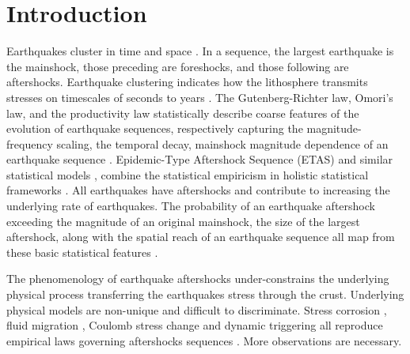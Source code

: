 \documentclass[12pt, notitlepage]{report}
\begin{document}
\section{Introduction}
Earthquakes cluster in time and space \cite{Omori1895}. In a sequence, the largest earthquake is the mainshock, those preceding are foreshocks, and those following are aftershocks. Earthquake clustering indicates how the lithosphere transmits stresses on timescales of seconds to years \cite{felzer2006decay, Stein1999, Scholz2019TheFaulting, Shebalin2017}. The Gutenberg-Richter law, Omori's law, and the productivity law statistically describe coarse features of the evolution of earthquake sequences, respectively capturing the magnitude-frequency scaling, the temporal decay, mainshock magnitude dependence of an earthquake sequence  \cite{deArcangelis2016StatisticalForecasting, Helmstetter2003BathsProperties, GutenbergBulletinAmerica,Omori1895}. Epidemic-Type Aftershock Sequence (ETAS) \cite{Kagan1981StochasticCatalogs,Ogata1988} and similar statistical models \cite{Holliday2008ABASS}, combine the statistical empiricism in holistic statistical frameworks \cite{ogata2017statistics}. All earthquakes have aftershocks and contribute to increasing the underlying rate of earthquakes. The probability of an earthquake aftershock exceeding the magnitude of an original mainshock, the size of the largest aftershock, along with the spatial reach of an earthquake sequence all map from these basic statistical features \cite{Helmstetter2003BathsProperties, Reasenberg1999ForeshockEarthquakes}.

The phenomenology of earthquake aftershocks under-constrains the underlying physical process transferring the earthquakes stress through the crust. Underlying physical models are non-unique and difficult to discriminate. Stress corrosion \cite{Das1981}, fluid migration \cite{Nur1972AftershocksFlow,Ross2017AftershocksMesh}, Coulomb stress change \cite{Stein1999} and dynamic triggering \cite{felzer2006decay} all reproduce empirical laws governing aftershocks sequences \cite{Scholz2019TheFaulting}. More observations are necessary.
\end{document}
